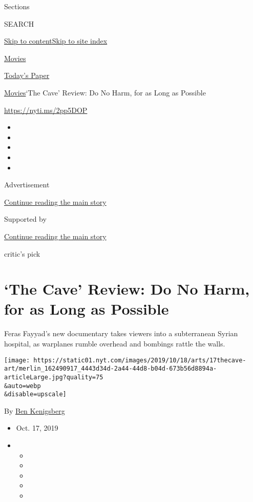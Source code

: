 Sections

SEARCH

\protect\hyperlink{site-content}{Skip to
content}\protect\hyperlink{site-index}{Skip to site index}

\href{https://www.nytimes.com/section/movies}{Movies}

\href{https://myaccount.nytimes.com/auth/login?response_type=cookie\&client_id=vi}{}

\href{https://www.nytimes.com/section/todayspaper}{Today's Paper}

\href{/section/movies}{Movies}\textbar{}`The Cave' Review: Do No Harm,
for as Long as Possible

\href{https://nyti.ms/2pp5DOP}{https://nyti.ms/2pp5DOP}

\begin{itemize}
\item
\item
\item
\item
\item
\end{itemize}

Advertisement

\protect\hyperlink{after-top}{Continue reading the main story}

Supported by

\protect\hyperlink{after-sponsor}{Continue reading the main story}

critic's pick

\hypertarget{the-cave-review-do-no-harm-for-as-long-as-possible}{%
\section{`The Cave' Review: Do No Harm, for as Long as
Possible}\label{the-cave-review-do-no-harm-for-as-long-as-possible}}

Feras Fayyad's new documentary takes viewers into a subterranean Syrian
hospital, as warplanes rumble overhead and bombings rattle the walls.

\texttt{[image: https://static01.nyt.com/images/2019/10/18/arts/17thecave-art/merlin\_162490917\_4443d34d-2a44-44d8-b04d-673b56d8894a-articleLarge.jpg?quality=75\\\&auto=webp\\\&disable=upscale]}

By \href{https://www.nytimes.com/by/ben-kenigsberg}{Ben Kenigsberg}

\begin{itemize}
\item
  Oct. 17, 2019
\item
  \begin{itemize}
  \item
  \item
  \item
  \item
  \item
  \end{itemize}
\end{itemize}

